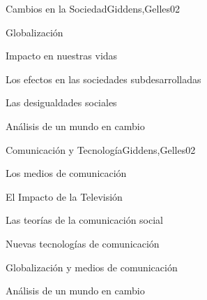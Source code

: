 \begin{syllabus}
\begin{unit}{Cambios en la Sociedad}{Giddens,Gelles}{0}{2}
    \begin{topics}
      \item Globalización
      \item Impacto en nuestras vidas
      \item Los efectos en las sociedades subdesarrolladas
      \item Las desigualdades sociales
    \end{topics}
    \begin{learningoutcomes}
      \item Análisis de un mundo en cambio
    \end{learningoutcomes}
\end{unit}

\begin{unit}{Comunicación y Tecnología}{Giddens,Gelles}{0}{2}
    \begin{topics}
      \item Los medios de comunicación
      \item El Impacto de la Televisión
      \item Las teorías de la comunicación social
      \item Nuevas tecnologías de comunicación
      \item Globalización y medios de comunicación
    \end{topics}
    \begin{learningoutcomes}
      \item Análisis de un mundo en cambio
    \end{learningoutcomes}
\end{unit}



\begin{coursebibliography}
\end{coursebibliography}

\end{syllabus}
